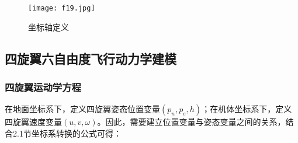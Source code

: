 \begin{figure}[!ht]
\centering
\texttt{[image: f19.jpg]}
\caption{坐标轴定义}
\label{fig19}
\end{figure}

  \subsection{四旋翼六自由度飞行动力学建模}
  \subsubsection{四旋翼运动学方程}
	在地面坐标系下，定义四旋翼姿态位置变量$\left( {{p_n},{p_e},h} \right)$；在机体坐标系下，定义四旋翼速度变量$\left( {u,v,\omega } \right)$。因此，需要建立位置变量与姿态变量之间的关系，结合2.1节坐标系转换的公式可得：

